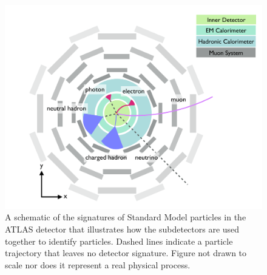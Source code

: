 \begin{figure}[htbp]
\centering
\includegraphics[width=.6\textwidth]{figures/Detector/particle-doodle.png}
\caption{A schematic of the signatures of Standard Model particles in the \ac{ATLAS} detector that illustrates how the subdetectors are used together to identify particles. Dashed lines indicate a particle trajectory that leaves no detector signature. Figure not drawn to scale nor does it represent a real physical process.}
\label{fig:particle-doodles}
\end{figure}






